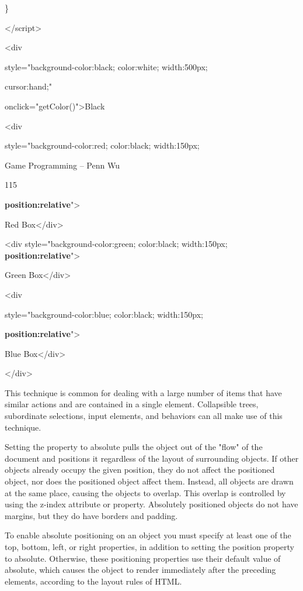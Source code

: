 \documentclass[
]{article}
\begin{document}
\}

\textless/script\textgreater{}

\textless div

style="background-color:black; color:white; width:500px;

cursor:hand;"

onclick="getColor()"\textgreater Black

\textless div

style="background-color:red; color:black; width:150px;

Game Programming -- Penn Wu

115

\protect\hypertarget{index_split_008.htmlux5cux23p116}{}{}\textbf{position:relative}"\textgreater{}

Red Box\textless/div\textgreater{}

\textless div style="background-color:green; color:black; width:150px;
\textbf{position:relative}"\textgreater{}

Green Box\textless/div\textgreater{}

\textless div

style="background-color:blue; color:black; width:150px;

\textbf{position:relative}"\textgreater{}

Blue Box\textless/div\textgreater{}

\textless/div\textgreater{}

This technique is common for dealing with a large number of items that
have similar actions and are contained in a single element. Collapsible
trees, subordinate selections, input elements, and behaviors can all
make use of this technique.

Setting the property to absolute pulls the object out of the "flow" of
the document and positions it regardless of the layout of surrounding
objects. If other objects already occupy the given position, they do not
affect the positioned object, nor does the positioned object affect
them. Instead, all objects are drawn at the same place, causing the
objects to overlap. This overlap is controlled by using the z-index
attribute or property. Absolutely positioned objects do not have
margins, but they do have borders and padding.

To enable absolute positioning on an object you must specify at least
one of the top, bottom, left, or right properties, in addition to
setting the position property to absolute. Otherwise, these positioning
properties use their default value of absolute, which causes the object
to render immediately after the preceding elements, according to the
layout rules of HTML.
\end{document}

